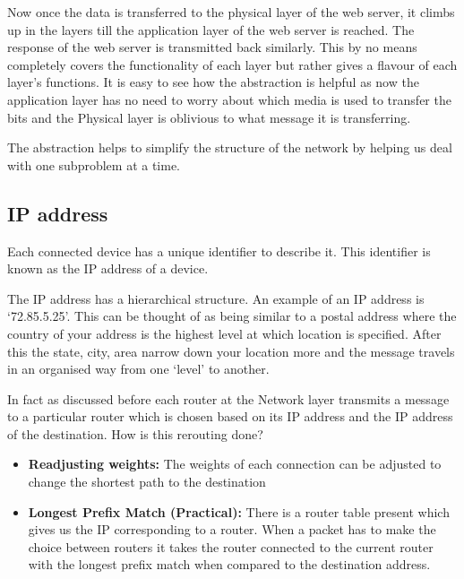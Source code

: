 \documentclass[12pt]{article}
\newcommand{\tbox}[1]{\noindent\fbox{\parbox{\textwidth}{#1}}}
\begin{document}
Now once the data is transferred to the physical layer of the web server, it climbs up in the layers till the application layer of the web server is reached. The response of 
the web server is transmitted back similarly. This by no means completely covers the functionality of each layer but rather gives a flavour of each layer's functions. It is easy to see 
how the abstraction is helpful as now the application layer has no need to worry about which media is used to transfer the bits 
and the Physical layer is oblivious to what message it is transferring. 

The abstraction helps to simplify the structure of the network by helping us deal with one subproblem at a time. 



\noindent\tbox{
    \begin{center}
    \textbf{\Huge Lecture 2}
    \end{center}
}


\subsection{IP address}

Each connected device has a unique identifier to describe it.
This identifier is known as the IP address of a device. 

The IP address has a hierarchical structure. An example of an IP address is `72.85.5.25'. This can be thought of 
as being similar to a postal address where the country of your address is the highest level at which location is specified. 
After this the state, city, area narrow down your location more and the message travels in an organised way from one `level' to another.

In fact as discussed before each router at the Network layer transmits a message to a particular router which is chosen based on its IP address and the IP address of the destination. 
How is this rerouting done?

\begin{itemize}
    \item \textbf{Readjusting weights:} The weights of each connection can be adjusted to change the shortest path to the destination
    \item \textbf{Longest Prefix Match (Practical):} There is a router table present which gives us the IP corresponding to a router. When a packet has to make the choice between routers it takes the router connected to the
    current router with the longest prefix match when compared to the destination address. 
\end{itemize}
\end{document}
